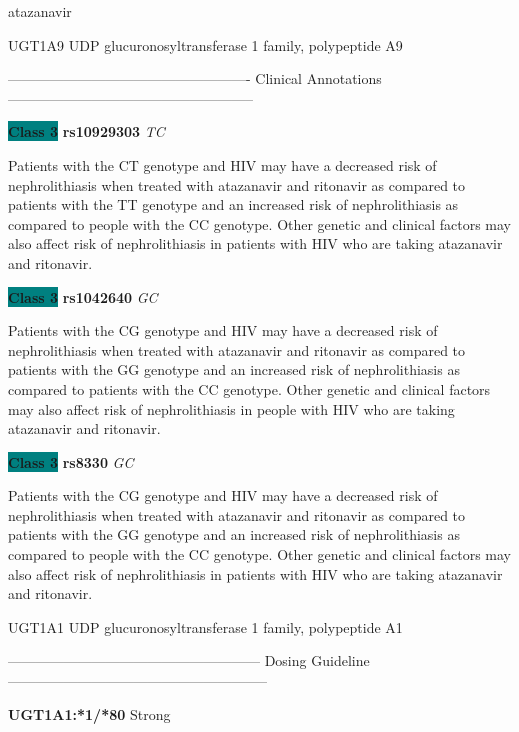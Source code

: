 \documentclass{resume} %
\begin{document}
\begin{rSection}{ atazanavir }
\begin{rSubsection}{ UGT1A9 }{ UDP glucuronosyltransferase 1 family, polypeptide A9 }{}{}
\item[] ---------------------------------------------------- Clinical Annotations -----------------------------------------------------\newline
\item \textbf{\colorbox{teal} {Class 3}} \textbf{ rs10929303 } \textit{ TC }
\item[] Patients with the CT genotype and HIV may have a decreased risk of nephrolithiasis when treated with atazanavir and ritonavir as compared to patients with the TT genotype and an increased risk of nephrolithiasis as compared to people with the CC genotype. Other genetic and clinical factors may also affect risk of nephrolithiasis in patients with HIV who are taking atazanavir and ritonavir. \item \textbf{\colorbox{teal} {Class 3}} \textbf{ rs1042640 } \textit{ GC }
\item[] Patients with the CG genotype and HIV may have a decreased risk of nephrolithiasis when treated with atazanavir and ritonavir as compared to patients with the GG genotype and an increased risk of nephrolithiasis as compared to patients with the CC genotype. Other genetic and clinical factors may also affect risk of nephrolithiasis in people with HIV who are taking atazanavir and ritonavir.\item \textbf{\colorbox{teal} {Class 3}} \textbf{ rs8330 } \textit{ GC }
\item[] Patients with the CG genotype and HIV may have a decreased risk of nephrolithiasis when treated with atazanavir and ritonavir as compared to patients with the GG genotype and an increased risk of nephrolithiasis as compared to people with the CC genotype. Other genetic and clinical factors may also affect risk of nephrolithiasis in patients with HIV who are taking atazanavir and ritonavir.
\end{rSubsection}\begin{rSubsection}{ UGT1A1 }{ UDP glucuronosyltransferase 1 family, polypeptide A1 }{}{}
\item[]
\item[] ------------------------------------------------------ Dosing Guideline --------------------------------------------------------\newline
\item[]
\item[] \textbf{ UGT1A1:*1/*80 } Strong


\end{rSubsection}
\end{rSection}
\end{document}
